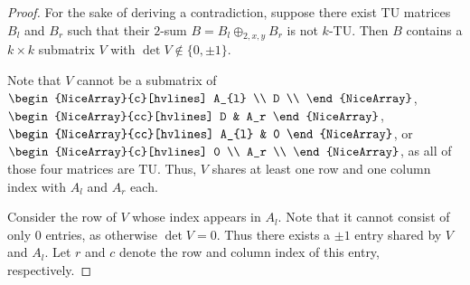 \documentclass{article}
\theoremstyle{definition}
\begin{document}
\begin{proof}
    For the sake of deriving a contradiction, suppose there exist TU matrices $B_{l}$ and $B_{r}$ such that their $2$-sum $B = B_{l} \oplus_{2, x, y} B_{r}$ is not $k$-TU. Then $B$ contains a $k \times k$ submatrix $V$ with $\det V \notin \{0, \pm 1\}$.

    Note that $V$ cannot be a submatrix of $\begin{NiceArray}{c}[hvlines] A_{l} \\ D \\ \end{NiceArray}$, $\begin{NiceArray}{cc}[hvlines] D & A_r \end{NiceArray}$, $\begin{NiceArray}{cc}[hvlines] A_{l} & 0 \end{NiceArray}$, or  $\begin{NiceArray}{c}[hvlines] 0 \\ A_r \\ \end{NiceArray}$, as all of those four matrices are TU. Thus, $V$ shares at least one row and one column index with $A_{l}$ and $A_{r}$ each.

    Consider the row of $V$ whose index appears in $A_{l}$. Note that it cannot consist of only $0$ entries, as otherwise $\det V = 0$. Thus there exists a $\pm 1$ entry shared by $V$ and $A_{l}$. Let $r$ and $c$ denote the row and column index of this entry, respectively.


\end{proof}
\end{document}

